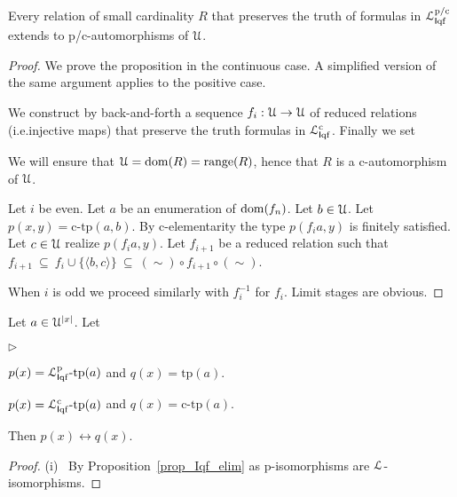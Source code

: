 \documentclass{amsproc}
\newcommand{\mylabel}[1]{{#1}\hfill}
\renewenvironment{itemize}
  {\begin{list}{$\triangleright$}{%
  \setlength{\parskip}{0mm}
  \setlength{\topsep}{.4\baselineskip}
  \setlength{\rightmargin}{0mm}
  \setlength{\listparindent}{0mm}
  \setlength{\itemindent}{0mm}
  \setlength{\labelwidth}{3ex}
  \setlength{\itemsep}{.2\baselineskip}
  \setlength{\parsep}{.2\baselineskip}
  \setlength{\partopsep}{0mm}
  \setlength{\labelsep}{1ex}
  \setlength{\leftmargin}{\labelwidth+\labelsep}
  \let\makelabel\mylabel}}{%
\end{list}}
\begin{document}
{\begin{proposition}\label{prop_Iqf_elim}
  Every relation of small cardinality $R$ that preserves the truth of formulas in ${\EuScript L}^{\rm p/c}_{{\sf I}{\rm qf}}$ extends to p/c-automorphisms of ${\EuScript U}$.
\end{proposition}

\begin{proof}
  We prove the proposition in the continuous case.
  A simplified version of the same argument applies to the positive case.

  We construct by back-and-forth a sequence $f_i:{\EuScript U}\rightarrow{\EuScript U}$ of reduced relations (i.e.\@ injective maps) that preserve the truth formulas in ${\EuScript L}^{\rm c}_{{\sf I}{\rm qf}}$.
  Finally we set 
  

  We will ensure that ${\EuScript U}={\rm dom}(R)={\rm range}(R)$, hence that $R$ is a c-automorphism of ${\EuScript U}$.

  Let $i$ be even.
  Let $a$ be an enumeration of ${\rm dom}(f_n)$.
  Let $b\in{\EuScript U}$. 
  Let $p(x,y)=\mbox{c-tp}(a,b)$.
  By c-elementarity the type $p(f_ia,y)$ is finitely satisfied.
  Let $c\in{\EuScript U}$ realize $p(f_ia,y)$.
  Let $f_{i+1}$ be a reduced relation such that $f_{i+1}\ \subseteq\ f_i\cup\{\langle b,c\rangle\}\ \subseteq\ (\sim)\circ f_{i+1}\circ(\sim)$.

  When $i$ is odd we proceed similarly with $f_i^{-1}$ for $f_i$.
  Limit stages are obvious.
\end{proof}

\begin{corollary}\label{corol_cLcomplete}
  Let $a\in{\EuScript U}^{|x|}$.
  Let
  \begin{itemize}
    \item[i.] $p(x)={\EuScript L}^{\rm p}_{{\sf I}{\rm qf}}\mbox{-tp}(a)$ and $q(x)=\mbox{tp}(a)$.
    \item[ii.] $p(x)={\EuScript L}^{\rm c}_{{\sf I}{\rm qf}}\mbox{-tp}(a)$ and $q(x)=\mbox{c-tp}(a)$.
  \end{itemize}

  Then $p(x)\leftrightarrow q(x)$.
\end{corollary}

\begin{proof}
  (i) \ 
  By Proposition~\ref{prop_Iqf_elim} as p-isomorphisms are ${\EuScript L}$-isomorphisms.



\end{proof}}
\end{document}
